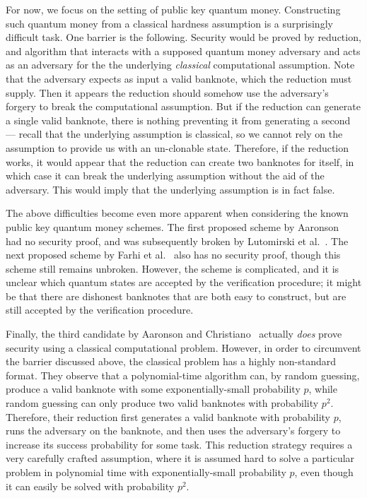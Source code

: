 \medskip

For now, we focus on the setting of public key quantum money.  Constructing such quantum money from a classical hardness assumption is a surprisingly difficult task.  One barrier is the following.  Security would be proved by reduction, and algorithm that interacts with a supposed quantum money adversary and acts as an adversary for the the underlying \emph{classical} computational assumption.  Note that the adversary expects as input a valid banknote, which the reduction must supply.  Then it appears the reduction should somehow use the adversary's forgery to break the computational assumption.  But if the reduction can generate a single valid banknote, there is nothing preventing it from generating a second --- recall that the underlying assumption is classical, so we cannot rely on the assumption to provide us with an un-clonable state.  Therefore, if the reduction works, it would appear that the reduction can create two banknotes for itself, in which case it can break the underlying assumption without the aid of the adversary.  This would imply that the underlying assumption is in fact false.

The above difficulties become even more apparent when considering the known public key quantum money schemes.  The first proposed scheme by Aaronson~\cite{CCC:Aaronson09} had no security proof, and was subsequently broken by Lutomirski et al.~\cite{ITCS:LAFGKH10}.  The next proposed scheme by Farhi et al.~\cite{ITCS:FGHLS12} also has no security proof, though this scheme still remains unbroken.  However, the scheme is complicated, and it is unclear which quantum states are accepted by the verification procedure; it might be that there are dishonest banknotes that are both easy to construct, but are still accepted by the verification procedure.

Finally, the third candidate by Aaronson and Christiano~\cite{STOC:AarChr12} actually \emph{does} prove security using a classical computational problem.  However, in order to circumvent the barrier discussed above, the classical problem has a highly non-standard format.  They observe that a polynomial-time algorithm can, by random guessing, produce a valid banknote with some exponentially-small probability $p$, while random guessing can only produce two valid banknotes with probability $p^2$.  Therefore, their reduction first generates a valid banknote with probability $p$, runs the adversary on the banknote, and then uses the adversary's forgery to increase its success probability for some task.  This reduction strategy requires a very carefully crafted assumption, where it is assumed hard to solve a particular problem in polynomial time with exponentially-small probability $p$, even though it can easily be solved with probability $p^2$.  

